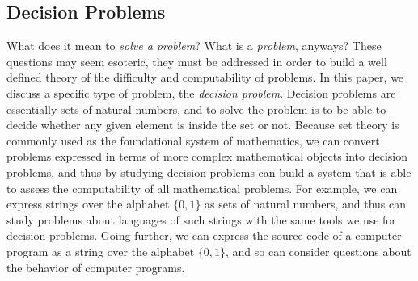 \documentclass[psamsfonts]{amsart}
\theoremstyle{definition}
\theoremstyle{remark}
\numberwithin{equation}{section}
\begin{document}
\subsection{Decision Problems}
What does it mean to \emph{solve a problem}? What is a \emph{problem}, anyways?
These questions may seem esoteric, they must be addressed in order to build a
well defined theory of the difficulty and computability of problems. In this paper, we discuss a
specific type of problem, the \emph{decision problem}. Decision problems are
essentially sets of natural numbers, and to solve the problem is to be able to
decide whether any given element is inside the set or not. Because set theory is
commonly used as the foundational system of mathematics, we can convert problems
expressed in terms of more complex mathematical objects into decision problems,
and thus by studying decision problems can build a system that is able to assess
the computability of all mathematical problems. For example, we can express
strings over the alphabet $\{0,1\}$ as sets of natural numbers, and thus can
study problems about languages of such strings with the same tools we use for
decision problems. Going further, we can express the source code of a computer
program as a string over the alphabet $\{0,1\}$, and so can consider questions
about the behavior of computer programs.
\end{document}
